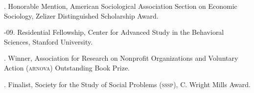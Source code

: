 \documentclass[11pt]{article}
\begin{document}
% 
% 
% 
%   
% 
% 
% 
%   
% 
% 
% 
% 
% 
% 
% 
% 
% 
% 
% 

\bigskip

\medskip
  
. Honorable Mention, American Sociological Association Section on Economic Sociology, Zelizer Distinguished Scholarship Award.

-09. Residential Fellowship, Center for Advanced Study in the Behavioral Sciences, Stanford University.

. Winner, Association for Research on Nonprofit Organizations and Voluntary Action (\textsc{arnova}) Outstanding Book Prize.

. Finalist, Society for the Study of Social Problems (\textsc{sssp}), C. Wright Mills Award.
\end{document}

